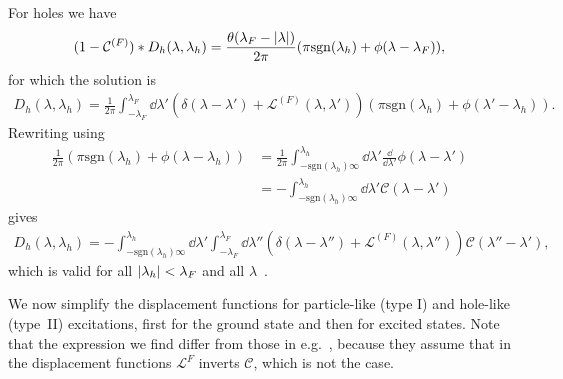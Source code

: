 \documentclass[11pt, a4paper]{report} %
\begin{document}
For holes we have 
\begin{align}
  \label{eq:37}
  (1-\mathcal{C}^{(F)})* D_h(\lambda,\lambda_h) = \frac{\theta(\lambda_F-\abs{\lambda})}{2\pi} (\pi\mathrm{sgn}(\lambda_h) + \phi(\lambda-\lambda_F)),
\end{align}
for which the solution is 
\begin{align}
  \label{eq:38}
  D_h(\lambda,\lambda_h) = \frac{1}{2\pi} \int_{-\lambda_F}^{\lambda_F} \dd \lambda' \left(\delta(\lambda-\lambda')+\mathcal{L}^{(F)}(\lambda,\lambda')\right)(\pi\mathrm{sgn}(\lambda_h) + \phi(\lambda'-\lambda_h)).
\end{align}
Rewriting using
\begin{align}
  \label{eq:39}
  \frac{1}{2\pi} (\pi \mathrm{sgn}(\lambda_h) + \phi(\lambda-\lambda_h)) &= \frac{1}{2\pi} \int_{-\mathrm{sgn}(\lambda_h)\infty}^{\lambda_h} \dd \lambda' \frac{\dd}{\dd\lambda'} \phi(\lambda - \lambda') \\
                                                                         &= - \int_{-\mathrm{sgn}(\lambda_h)\infty}^{\lambda_h} \dd \lambda' \mathcal{C}(\lambda-\lambda')
\end{align}
gives
\begin{align}
  \label{eq:40}
  D_h(\lambda, \lambda_h) = - \int_{-\textrm{sgn}(\lambda_h)\infty}^{\lambda_h} \dd \lambda' \int_{-\lambda_F}^{\lambda_F} \dd \lambda'' \left(\delta(\lambda-\lambda'') + \mathcal{L}^{(F)}(\lambda,\lambda'') \right)\mathcal{C}(\lambda''-\lambda'),
\end{align}
which is valid for all \(\abs{\lambda_h}<\lambda_F\) and all \(\lambda\)~\cite{Caux2015}.

We now simplify the displacement functions for particle-like (type I) and hole-like (type~II) excitations, first for the ground state and then for excited states.
Note that the expression we find differ from those in e.g.~\cite{Korepin1993}, because they assume that in the displacement functions \(\mathcal{L}^{F}\) inverts \(\mathcal{C}\), which is not the case.
\end{document}
